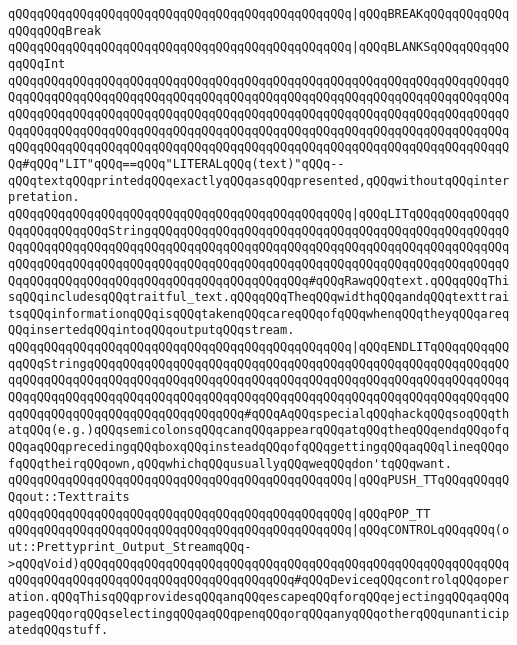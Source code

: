 \verb|qQQqqQQqqQQqqQQqqQQqqQQqqQQqqQQqqQQqqQQqqQQqqQQq|\verb#|qQQqBREAKqQQqqQQqqQQqqQQqqQQqBreak#\newline
\newline
\verb|qQQqqQQqqQQqqQQqqQQqqQQqqQQqqQQqqQQqqQQqqQQqqQQq|\verb#|qQQqBLANKSqQQqqQQqqQQqqQQqInt#\newline
\verb|qQQqqQQqqQQqqQQqqQQqqQQqqQQqqQQqqQQqqQQqqQQqqQQqqQQqqQQqqQQqqQQqqQQqqQQqqQQqqQQqqQQqqQQqqQQqqQQqqQQqqQQqqQQqqQQqqQQqqQQqqQQqqQQqqQQqqQQqqQQqqQQqqQQqqQQqqQQqqQQqqQQqqQQqqQQqqQQqqQQqqQQqqQQqqQQqqQQqqQQqqQQqqQQqqQQqqQQqqQQqqQQqqQQqqQQqqQQqqQQqqQQqqQQqqQQqqQQqqQQqqQQqqQQqqQQqqQQqqQQqqQQqqQQqqQQqqQQqqQQqqQQqqQQqqQQqqQQqqQQqqQQqqQQqqQQqqQQqqQQqqQQqqQQqqQQq#qQQq"LIT"qQQq==qQQq"LITERALqQQq(text)"qQQq--qQQqtextqQQqprintedqQQqexactlyqQQqasqQQqpresented,qQQqwithoutqQQqinterpretation.|\newline
\verb|qQQqqQQqqQQqqQQqqQQqqQQqqQQqqQQqqQQqqQQqqQQqqQQq|\verb#|qQQqLITqQQqqQQqqQQqqQQqqQQqqQQqqQQqStringqQQqqQQqqQQqqQQqqQQqqQQqqQQqqQQqqQQqqQQqqQQqqQQqqQQqqQQqqQQqqQQqqQQqqQQqqQQqqQQqqQQqqQQqqQQqqQQqqQQqqQQqqQQqqQQqqQQqqQQqqQQqqQQqqQQqqQQqqQQqqQQqqQQqqQQqqQQqqQQqqQQqqQQqqQQqqQQqqQQqqQQqqQQqqQQqqQQqqQQqqQQqqQQqqQQqqQQqqQQqqQQqqQQqqQQq#\verb|#qQQqRawqQQqtext.qQQqqQQqThisqQQqincludesqQQqtraitful_text.qQQqqQQqTheqQQqwidthqQQqandqQQqtexttraitsqQQqinformationqQQqisqQQqtakenqQQqcareqQQqofqQQqwhenqQQqtheyqQQqareqQQqinsertedqQQqintoqQQqoutputqQQqstream.|\newline
\verb|qQQqqQQqqQQqqQQqqQQqqQQqqQQqqQQqqQQqqQQqqQQqqQQq|\verb#|qQQqENDLITqQQqqQQqqQQqqQQqStringqQQqqQQqqQQqqQQqqQQqqQQqqQQqqQQqqQQqqQQqqQQqqQQqqQQqqQQqqQQqqQQqqQQqqQQqqQQqqQQqqQQqqQQqqQQqqQQqqQQqqQQqqQQqqQQqqQQqqQQqqQQqqQQqqQQqqQQqqQQqqQQqqQQqqQQqqQQqqQQqqQQqqQQqqQQqqQQqqQQqqQQqqQQqqQQqqQQqqQQqqQQqqQQqqQQqqQQqqQQqqQQqqQQqqQQq#\verb|#qQQqAqQQqspecialqQQqhackqQQqsoqQQqthatqQQq(e.g.)qQQqsemicolonsqQQqcanqQQqappearqQQqatqQQqtheqQQqendqQQqofqQQqaqQQqprecedingqQQqboxqQQqinsteadqQQqofqQQqgettingqQQqaqQQqlineqQQqofqQQqtheirqQQqown,qQQqwhichqQQqusuallyqQQqweqQQqdon'tqQQqwant.|\newline
\newline
\verb|qQQqqQQqqQQqqQQqqQQqqQQqqQQqqQQqqQQqqQQqqQQqqQQq|\verb#|qQQqPUSH_TTqQQqqQQqqQQqout::Texttraits#\newline
\verb|qQQqqQQqqQQqqQQqqQQqqQQqqQQqqQQqqQQqqQQqqQQqqQQq|\verb#|qQQqPOP_TT#\newline
\verb|qQQqqQQqqQQqqQQqqQQqqQQqqQQqqQQqqQQqqQQqqQQqqQQq|\verb#|qQQqCONTROLqQQqqQQq(out::Prettyprint_Output_StreamqQQq->qQQqVoid)qQQqqQQqqQQqqQQqqQQqqQQqqQQqqQQqqQQqqQQqqQQqqQQqqQQqqQQqqQQqqQQqqQQqqQQqqQQqqQQqqQQqqQQqqQQqqQQqqQQq#\verb|#qQQqDeviceqQQqcontrolqQQqoperation.qQQqThisqQQqprovidesqQQqanqQQqescapeqQQqforqQQqejectingqQQqaqQQqpageqQQqorqQQqselectingqQQqaqQQqpenqQQqorqQQqanyqQQqotherqQQqunanticipatedqQQqstuff.|\newline

